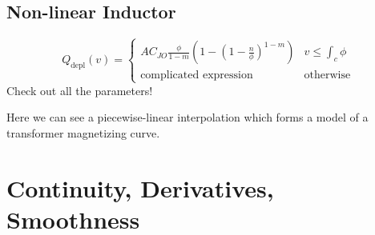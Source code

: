 \documentclass{report}
\begin{document}
\subsection{Non-linear Inductor}
\begin{description}
    \item[]
\end{description}

\begin{example}
    \begin{equation*}
        Q_{\mathrm{depl}}(v) = 
        \begin{cases}
            A C_{JO} \frac{\phi}{1 - m}(1 - (1 - \frac{n}{\phi})^{1 - m}) & v \leq \int_c \phi \\
            \text{complicated expression} & \text{otherwise}
        \end{cases}
    \end{equation*}
    Check out all the parameters!

\end{example}

\begin{example}
    Here we can see a piecewise-linear interpolation which forms a model of a transformer magnetizing curve.
\end{example}

\section{Continuity, Derivatives, Smoothness}
\end{document}
